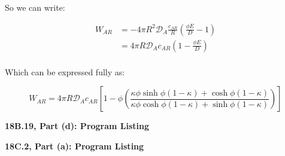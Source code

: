 \documentclass[letterpaper,12pt]{article}
\begin{document}
So we can write:

\begin{equation}
\begin{aligned}
    W_{AR} &= - 4 \pi R^2 \mathcal{D}_A \frac{c_{AR}}{R} \left( \frac{\phi E}{D} - 1 \right) \\
           &= 4 \pi R \mathcal{D}_A c_{AR} \left( 1 - \frac{\phi E}{D} \right) \\
\end{aligned}
\end{equation}

Which can be expressed fully as:

\begin{equation}
\boxed{
     W_{AR} = 4 \pi R \mathcal{D}_A c_{AR} \left[ 1 - \phi \left( \frac{\kappa \phi \sinh{\phi(1 - \kappa)} + \cosh{\phi(1 - \kappa)}}{\kappa \phi \cosh{\phi(1 - \kappa)} + \sinh{\phi(1 - \kappa)}} \right)  \right]
}
\end{equation}

\vspace{6pt}

\newpage
\textbf{18B.19, Part (d): Program Listing}



\newpage

\textbf{18C.2, Part (a): Program Listing}


\end{document}
